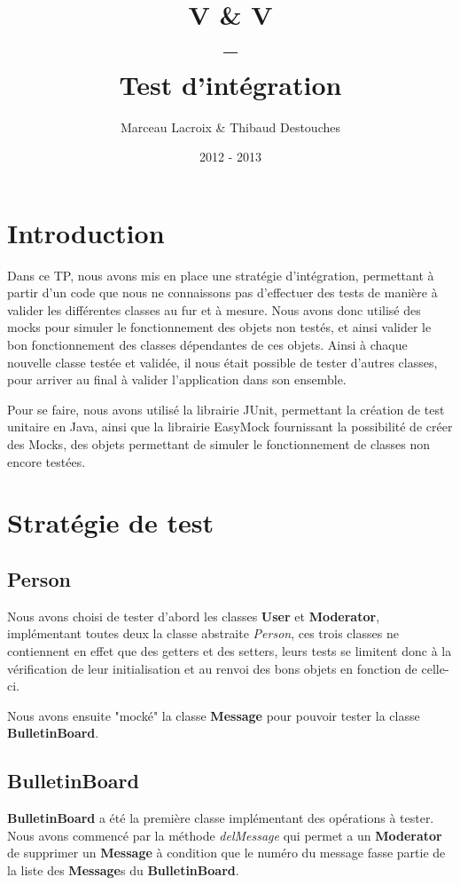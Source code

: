 \documentclass{article}
\title{V \& V
\\
--
\\
Test d'intégration}
\author{Marceau Lacroix \& Thibaud Destouches}
\date{2012 - 2013}
\begin{document}
\begin{titlepage}
\maketitle
\end{titlepage}

\newpage
\section*{Introduction}
Dans ce TP, nous avons mis en place une stratégie d'intégration, permettant à partir d'un code que nous ne connaissons pas d'effectuer des tests de manière à valider les différentes classes au fur et à mesure. Nous avons donc utilisé des mocks pour simuler le fonctionnement des objets non testés, et ainsi valider le bon fonctionnement des classes dépendantes de ces objets. Ainsi à chaque nouvelle classe testée et validée, il nous était possible de tester d'autres classes, pour arriver au final à valider l'application dans son ensemble.

Pour se faire, nous avons utilisé la librairie JUnit, permettant la création de test unitaire en Java, ainsi que la librairie EasyMock fournissant la possibilité de créer des Mocks, des objets permettant de simuler le fonctionnement de classes non encore testées.

\newpage
\section{Stratégie de test}

\subsection{Person}
Nous avons choisi de tester d'abord les classes \textbf{User} et \textbf{Moderator}, implémentant toutes deux la classe abstraite \textit{Person}, ces trois classes ne contiennent en effet que des getters et des setters, leurs tests se limitent donc à la vérification de leur initialisation et au renvoi des bons objets en fonction de celle-ci.

Nous avons ensuite "mocké" la classe \textbf{Message} pour pouvoir tester la classe \textbf{BulletinBoard}.

\subsection{BulletinBoard}
\textbf{BulletinBoard} a été la première classe implémentant des opérations à tester. Nous avons commencé par la méthode \textit{delMessage} qui permet a un \textbf{Moderator} de supprimer un \textbf{Message} à condition que le numéro du message fasse partie de la liste des \textbf{Message}s du \textbf{BulletinBoard}.
\end{document}
